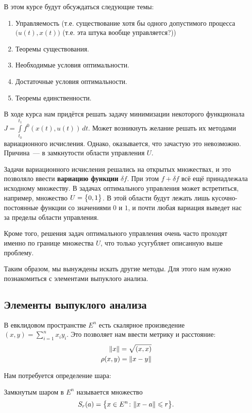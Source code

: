 \vspace{1cm}
В этом курсе будут обсуждаться следующие темы:
\begin{enumerate}
    \item Управляемость (т.е. существование хотя бы одного допустимого процесса $\bigl(u(t), x(t)\bigr)$ (т.е. эта штука вообще управляется?))
    \item Теоремы существования.
    \item Необходимые условия оптимальности.
    \item Достаточные условия оптимальности.
    \item Теоремы единственности.
\end{enumerate}

В ходе курса нам придётся решать задачу минимизации некоторого функционала $J = \int\limits_{t_0}^{t_1} f^0(x(t), u(t)) \, dt$.
Может возникнуть желание решать их методами вариационного исчисления.
Однако, оказывается, что зачастую это невозможно.
Причина~--- в замкнутости области управления $U$.

Задачи вариационного исчисления решались на открытых множествах, и это позволяло ввести \textbf{вариацию функции} $\delta f$.
При этом $f + \delta f$ всё ещё принадлежала исходному множеству.
В задачах оптимального управления может встретиться, например, множество $U = \bigl\{ 0, 1 \bigr\}$.
В этой области будут лежать лишь кусочно-постоянные функции со значениями $0$ и $1$, и почти любая вариация выведет нас за пределы области управления.

Кроме того, решения задач оптимального управления очень часто проходят именно по границе множества $U$, что только усугубляет описанную выше проблему.

Таким образом, мы вынуждены искать другие методы.
Для этого нам нужно познакомиться с элементами выпуклого анализа.

\subsection{Элементы выпуклого анализа}

В евклидовом пространстве $E^n$ есть скалярное произведение $(x, y) = \sum\limits_{i = 1}^{n} x_i y_i$.
Это позволяет нам ввести метрику и расстояние:
\begin{align}
    \lVert x \rVert = \sqrt{(x,x)} \\
    \rho(x, y) = \lVert x-y \rVert
\end{align}

Нам потребуется определение шара:
\begin{defn}
    \label{lection2:ball}
    Замкнутым шаром в $E^n$ называется множество
    \begin{equation}
        S_r(a) = \bigl\{ x \in E^n \colon \lVert x - a \rVert \leqslant r \bigr\}.
    \end{equation}
\end{defn}

